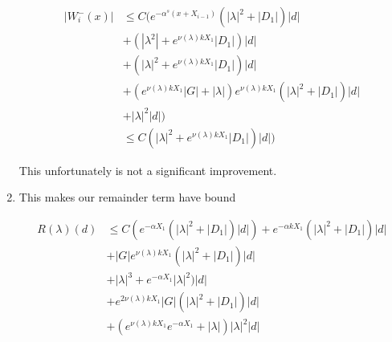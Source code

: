 \documentclass[12pt]{article}
\begin{document}
\begin{enumerate}
\begin{align*}
| W_i^-(x)| &\leq C ( e^{-\alpha^s(x + X_{i-1})} ( |\lambda|^2 + |D_1|) |d| \\
&+ (|\lambda^2| + e^{\nu(\lambda)k X_1}|D_1|)|d| \\
&+ ( |\lambda|^2 + e^{\nu(\lambda)k X_1} |D_1|) |d| \\
&+ (e^{\nu(\lambda)k X_1} |G| + |\lambda|) e^{\nu(\lambda)k X_1} ( |\lambda|^2 + |D_1| )|d| \\
&+ |\lambda|^2 |d| ) \\
&\leq C(|\lambda|^2 + e^{\nu(\lambda)k X_1}|D_1|)|d|  )
\end{align*}

This unfortunately is not a significant improvement.


\item This makes our remainder term have bound

\begin{align*}
R(\lambda)(d) &\leq C( e^{-\alpha X_1}( |\lambda|^2 + |D_1|)|d|) + e^{-\alpha k X_1} ( |\lambda|^2 + |D_1|) |d| \\
&+ |G| e^{\nu(\lambda)k X_1} ( |\lambda|^2 + |D_1| )|d| \\ 
&+ |\lambda|^3 + e^{-\alpha X_1} |\lambda|^2 )|d| \\
&+ e^{2 \nu(\lambda) k X_1} |G| ( |\lambda|^2 + |D_1| )|d| \\
&+ (e^{\nu(\lambda)k X_1} e^{-\alpha X_1} + |\lambda|)|\lambda|^2|d|\\
\end{align*}







\end{enumerate}
\end{document}
